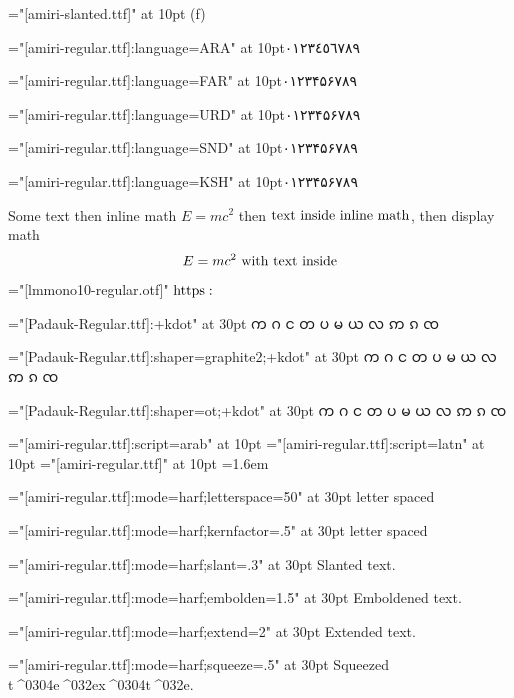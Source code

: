 \font\testi="[amiri-slanted.ttf]" at 10pt
({\testi f\/})

\def\l#1#2{%
  \begingroup
  \font\test="[amiri-regular.ttf]:language=#1" at 10pt\test #2%
  \endgroup
}
\l{ARA}{٠١٢٣٤٥٦٧٨٩}\par
\l{FAR}{۰۱۲۳۴۵۶۷۸۹}\par
\l{URD}{۰۱۲۳۴۵۶۷۸۹}\par
\l{SND}{۰۱۲۳۴۵۶۷۸۹}\par
\l{KSH}{۰۱۲۳۴۵۶۷۸۹}\par

Some text then inline math $E=mc^2$ then $\hbox{text inside inline math}$, then
display math $$E=mc^2\hbox{ with text inside}$$

\begingroup
\font\test="[lmmono10-regular.otf]"\test
$\fam0 \textfont0\font https:$
\endgroup

\font\test="[Padauk-Regular.ttf]:+kdot"                  at 30pt\test
က ဂ င တ ပ မ ယ လ ဢ ၵ ၸ \par
\font\test="[Padauk-Regular.ttf]:shaper=graphite2;+kdot" at 30pt\test
က ဂ င တ ပ မ ယ လ ဢ ၵ ၸ \par
\font\test="[Padauk-Regular.ttf]:shaper=ot;+kdot"        at 30pt\test
က ဂ င တ ပ မ ယ လ ဢ ၵ ၸ \par


\font\arab="[amiri-regular.ttf]:script=arab" at 10pt\arab
\font\latn="[amiri-regular.ttf]:script=latn" at 10pt\latn
\font\dflt="[amiri-regular.ttf]" at 10pt\dflt
\baselineskip=1.6em

\font\test="[amiri-regular.ttf]:mode=harf;letterspace=50" at 30pt\test
letter spaced

\font\test="[amiri-regular.ttf]:mode=harf;kernfactor=.5" at 30pt\test
letter spaced

\font\test="[amiri-regular.ttf]:mode=harf;slant=.3" at 30pt\test
Slanted text.

\font\test="[amiri-regular.ttf]:mode=harf;embolden=1.5" at 30pt\test
Emboldened text.

\font\test="[amiri-regular.ttf]:mode=harf;extend=2" at 30pt\test
Extended text.

\font\test="[amiri-regular.ttf]:mode=harf;squeeze=.5" at 30pt\test
Squeezed t^^^^0304e^^^^032ex^^^^0304t^^^^032e.

